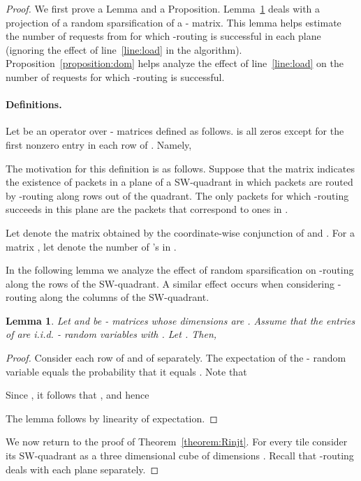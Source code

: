\documentclass[11pt]{article}
\newtheorem{lemma}[theorem]{Lemma}
\newenvironment{proof sketch}[1]{\noindent {\emph{Proof sketch of #1:}}}{\hfill \qed}
\begin{document}
\begin{proof}
  We first prove a Lemma and a Proposition. Lemma~\ref{lemma:sparse} deals with a
  projection of a random sparsification of a - matrix. This
  lemma helps estimate the number of requests from  for which
  -routing is successful in each plane (ignoring the effect of
  line~\ref{line:load} in the algorithm).
Proposition~\ref{proposition:dom} helps analyze the effect of
  line~\ref{line:load} on the number of requests for which
  -routing is successful.

\paragraph{Definitions.}

Let  be an operator over - matrices defined as follows.  is all
zeros except for the first nonzero entry in each row of . Namely,

The motivation for this definition is as follows. Suppose
that the matrix  indicates the existence of packets in a
plane of a SW-quadrant in which packets are routed by
-routing along rows out of the quadrant. The only
packets for which -routing succeeds in this plane are
the packets that correspond to ones in .

Let  denote the matrix obtained by the coordinate-wise
conjunction of  and . For a matrix , let  denote the number of
's in .

In the following lemma we analyze the effect of random sparsification on -routing along the rows of the SW-quadrant.
A similar effect occurs when considering -routing along the columns of the SW-quadrant.
\begin{lemma}\label{lemma:sparse}
  Let  and  be - matrices whose dimensions are . Assume that the entries of  are i.i.d. -
  random variables with .  Let . Then,
  
\end{lemma}
\begin{proof}
  Consider each row  of  and  of  separately.  The expectation of the
  - random variable  equals the probability that it equals .
  Note that

Since , it follows that ,
and hence

The lemma follows by linearity of expectation.
\end{proof}

We now return to the proof of Theorem~\ref{theorem:Rinjt}.  For every tile
consider its SW-quadrant as a three dimensional cube of dimensions
. Recall that -routing deals with
each  plane separately.


\end{proof}
\end{document}
